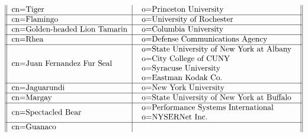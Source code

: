 \begin{table}
\[\begin{tabular}{||l|l||}
cn=Tiger
           &\begin{tabular}{l}
           o=Princeton University \\
           \end{tabular}\\ \hline
cn=Flamingo
           &\begin{tabular}{l}
           o=University of Rochester \\
           \end{tabular}\\ \hline
cn=Golden-headed Lion Tamarin
           &\begin{tabular}{l}
           o=Columbia University \\
           \end{tabular}\\ \hline
cn=Rhea
           &\begin{tabular}{l}
           o=Defense Communications Agency \\
           \end{tabular}\\ \hline
cn=Juan Fernandez Fur Seal
           &\begin{tabular}{l}
           o=State University of New York at Albany \\
           o=City College of CUNY \\
           o=Syracuse University \\
           o=Eastman Kodak Co. \\
           \end{tabular}\\ \hline
cn=Jaguarundi
           &\begin{tabular}{l}
           o=New York University \\
           \end{tabular}\\ \hline
cn=Margay
           &\begin{tabular}{l}
           o=State University of New York at Buffalo \\
           \end{tabular}\\ \hline
cn=Spectacled Bear
           &\begin{tabular}{l}
           o=Performance Systems International \\
           o=NYSERNet Inc. \\
           \end{tabular}\\ \hline
cn=Guanaco
           &\begin{tabular}{l}

\end{tabular}
\end{tabular}\]
\end{table}
